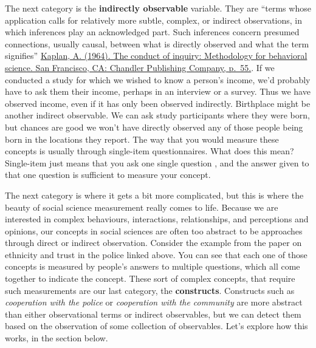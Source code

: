 \documentclass[]{book}
\theoremstyle{definition}
\theoremstyle{definition}
\theoremstyle{definition}
\theoremstyle{remark}
\begin{document}
The next category is the \textbf{indirectly observable} variable. They
are ``terms whose application calls for relatively more subtle, complex,
or indirect observations, in which inferences play an acknowledged part.
Such inferences concern presumed connections, usually causal, between
what is directly observed and what the term signifies''
\href{https://books.google.co.uk/books?id=wxwuDwAAQBAJ\&pg=PT89\&lpg=PT89\&dq=\%22terms+whose+application+calls+for+relatively+more+subtle,+complex,+or+indirect+observations,+in+which+inferences+play+an+acknowledged+part.+Such+inferences+concern+presumed+connections,+usually+causal,+between+what+is+directly+observed+and+what+the+term+signifies\%22\&source=bl\&ots=0_ySczx0oG\&sig=WVdwNE7mUzF_d8dfBk2R_Tq4clw\&hl=en\&sa=X\&ved=0ahUKEwihna-v5OrWAhXMYVAKHXvEBpIQ6AEIJjAA\#v=onepage\&q=\%22terms\%20whose\%20application\%20calls\%20for\%20relatively\%20more\%20subtle\%2C\%20complex\%2C\%20or\%20indirect\%20observations\%2C\%20in\%20which\%20inferences\%20play\%20an\%20acknowledged\%20part.\%20Such\%20inferences\%20concern\%20presumed\%20connections\%2C\%20usually\%20causal\%2C\%20between\%20what\%20is\%20directly\%20observed\%20and\%20what\%20the\%20term\%20signifies\%22\&f=false}{Kaplan,
A. (1964). The conduct of inquiry: Methodology for behavioral science.
San Francisco, CA: Chandler Publishing Company, p.~55.}. If we conducted
a study for which we wished to know a person's income, we'd probably
have to ask them their income, perhaps in an interview or a survey. Thus
we have observed income, even if it has only been observed indirectly.
Birthplace might be another indirect observable. We can ask study
participants where they were born, but chances are good we won't have
directly observed any of those people being born in the locations they
report. The way that you would measure these concepts is usually through
single-item questionnaires. What does this mean? Single-item just means
that you ask one single question , and the answer given to that one
question is sufficient to measure your concept.

The next category is where it gets a bit more complicated, but this is
where the beauty of social science measurement really comes to life.
Because we are interested in complex behaviours, interactions,
relationships, and perceptions and opinions, our concepts in social
sciences are often too abstract to be approaches through direct or
indirect observation. Consider the example from the paper on ethnicity
and trust in the police linked above. You can see that each one of those
concepts is measured by people's answers to multiple questions, which
all come together to indicate the concept. These sort of complex
concepts, that require such measurements are our last category, the
\textbf{constructs}. Constructs such as \emph{cooperation with the
police} or \emph{cooperation with the community} are more abstract than
either observational terms or indirect observables, but we can detect
them based on the observation of some collection of observables. Let's
explore how this works, in the section below.
\end{document}
